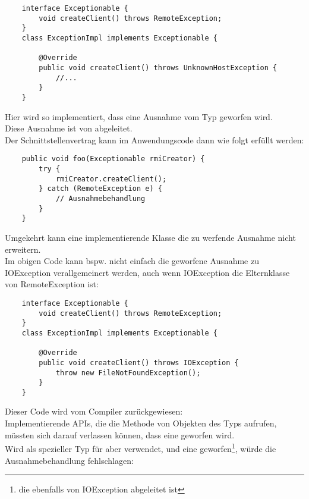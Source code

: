 \noindent
\begin{verbatim}
    interface Exceptionable {
        void createClient() throws RemoteException;
    }
    class ExceptionImpl implements Exceptionable {

        @Override
        public void createClient() throws UnknownHostException {
            //...
        }
    }
\end{verbatim}

Hier wird  so implementiert, dass eine Ausnahme vom Typ  geworfen wird.\\
Diese Ausnahme ist von  abgeleitet.\\

\noindent
Der Schnittstellenvertrag kann im Anwendungscode dann wie folgt erfüllt werden:

\begin{verbatim}
    public void foo(Exceptionable rmiCreator) {
        try {
            rmiCreator.createClient();
        } catch (RemoteException e) {
            // Ausnahmebehandlung
        }
    }
\end{verbatim}

Umgekehrt kann eine implementierende Klasse die zu werfende Ausnahme nicht erweitern.\\
Im obigen Code kann bspw. nicht einfach die geworfene Ausnahme zu IOException verallgemeinert werden, auch wenn IOException die Elternklasse von RemoteException ist:

\begin{verbatim}
    interface Exceptionable {
        void createClient() throws RemoteException;
    }
    class ExceptionImpl implements Exceptionable {

        @Override
        public void createClient() throws IOException {
            throw new FileNotFoundException();
        }
    }
\end{verbatim}

Dieser Code wird vom Compiler zurückgewiesen:\\
Implementierende APIs, die die Methode  von Objekten des Typs  aufrufen, müssten sich darauf verlassen können, dass eine  geworfen wird.\\
Wird als spezieller Typ für  aber  verwendet, und eine  geworfen\footnote{die ebenfalls von IOException abgeleitet ist}, würde die Ausnahmebehandlung fehlschlagen:

